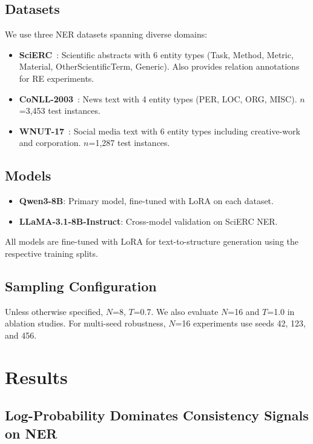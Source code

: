 \documentclass[11pt,a4paper]{article}
\begin{document}
\subsection{Datasets}
We use three NER datasets spanning diverse domains:
\begin{itemize}
    \item \textbf{SciERC}~\cite{luan2018scierc}: Scientific abstracts with 6 entity types (Task, Method, Metric, Material, OtherScientificTerm, Generic). Also provides relation annotations for RE experiments.
    \item \textbf{CoNLL-2003}~\cite{tjong2003conll}: News text with 4 entity types (PER, LOC, ORG, MISC). $n$=3,453 test instances.
    \item \textbf{WNUT-17}~\cite{derczynski2017wnut}: Social media text with 6 entity types including creative-work and corporation. $n$=1,287 test instances.
\end{itemize}

\subsection{Models}
\begin{itemize}
    \item \textbf{Qwen3-8B}: Primary model, fine-tuned with LoRA on each dataset.
    \item \textbf{LLaMA-3.1-8B-Instruct}: Cross-model validation on SciERC NER.
\end{itemize}
All models are fine-tuned with LoRA for text-to-structure generation using the respective training splits.

\subsection{Sampling Configuration}
Unless otherwise specified, $N$=8, $T$=0.7. We also evaluate $N$=16 and $T$=1.0 in ablation studies. For multi-seed robustness, $N$=16 experiments use seeds 42, 123, and 456.


\section{Results}

\subsection{Log-Probability Dominates Consistency Signals on NER}
\end{document}
